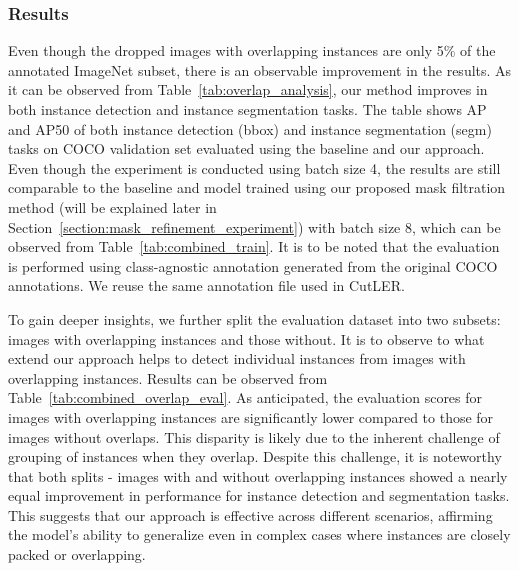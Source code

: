 \subsubsection{Results}
\label{section:overlapping-results}
Even though the dropped images with overlapping instances are only 5\% of the annotated ImageNet subset, there is an observable improvement in the results. As it can be observed from Table~\ref{tab:overlap_analysis}, our method improves in both instance detection and instance segmentation tasks. The table shows AP and AP50 of both instance detection (bbox) and instance segmentation (segm) tasks on COCO validation set evaluated using the baseline and our approach. Even though the experiment is conducted using batch size 4, the results are still comparable to the baseline and model trained using our proposed mask filtration method (will be explained later in Section~\ref{section:mask_refinement_experiment}) with batch size 8, which can be observed from Table~\ref{tab:combined_train}. It is to be noted that the evaluation is performed using class-agnostic annotation generated from the original COCO annotations. We reuse the same annotation file used in CutLER.

To gain deeper insights, we further split the evaluation dataset into two subsets: images with overlapping instances and those without. It is to observe to what extend our approach helps to detect individual instances from images with overlapping instances. Results can be observed from Table~\ref{tab:combined_overlap_eval}. As anticipated, the evaluation scores for images with overlapping instances are significantly lower compared to those for images without overlaps. This disparity is likely due to the inherent challenge of grouping of instances when they overlap. Despite this challenge, it is noteworthy that both splits - images with and without overlapping instances showed a nearly equal improvement in performance for instance detection and segmentation tasks. This suggests that our approach is effective across different scenarios, affirming the model’s ability to generalize even in complex cases where instances are closely packed or overlapping.

